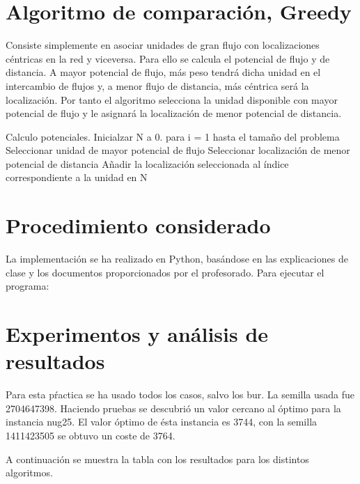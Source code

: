 \documentclass[twoside]{article}
\begin{document}
\section{Algoritmo de comparación, Greedy}

Consiste simplemente en asociar unidades de gran flujo con localizaciones céntricas en la red y viceversa. Para ello se calcula el potencial de flujo y de distancia. A mayor potencial de flujo, más peso tendrá dicha unidad en el intercambio de flujos y, a menor flujo de distancia, más céntrica será la localización. Por tanto el algoritmo selecciona la unidad disponible con mayor potencial de flujo y le asignará la localización de menor potencial de distancia.

\begin{pythoncode}
    Calculo potenciales.
    Inicialzar N a 0.
    para i = 1 hasta el tamaño del problema
        Seleccionar unidad de mayor potencial de flujo
        Seleccionar localización de menor potencial de distancia
        Añadir la localización seleccionada al índice correspondiente a la unidad en N
\end{pythoncode}

\section{Procedimiento considerado}

La implementación se ha realizado en Python, basándose en las explicaciones
de clase y los documentos proporcionados por el profesorado. Para ejecutar el programa:


\section{Experimentos y análisis de resultados}

Para esta pŕactica se ha usado todos los casos, salvo los bur. La semilla
usada fue 2704647398. Haciendo pruebas se descubrió un valor cercano al óptimo para la instancia
nug25. El valor óptimo de ésta instancia es 3744, con la semilla 1411423505
se obtuvo un coste de 3764.

A continuación se muestra la tabla con los resultados para los distintos algoritmos.
\end{document}
